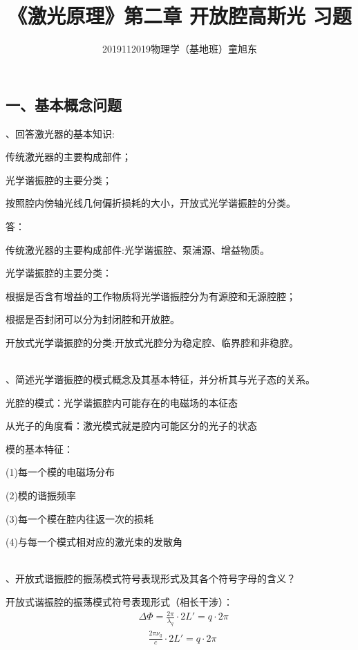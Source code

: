 \documentclass[12pt]{article}
\title{\fangsong《激光原理》\quad 第二章\; 开放腔高斯光 习题}
\author{2019112019物理学（基地班）童旭东}
\begin{document}
\maketitle

\subsection*{一、基本概念问题}

{、回答激光器的基本知识:
\par \quad \quad 传统激光器的主要构成部件；
\par \quad \quad 光学谐振腔的主要分类；
\par \quad \quad 按照腔内傍轴光线几何偏折损耗的大小，开放式光学谐振腔的分类。
}

{\kaishu
\par 答：
\par 
传统激光器的主要构成部件:光学谐振腔、泵浦源、增益物质。
\par 
光学谐振腔的主要分类：
\par \quad \quad \quad \quad 
根据是否含有增益的工作物质将光学谐振腔分为有源腔和无源腔腔；
\par \quad \quad \quad \quad 根据是否封闭可以分为封闭腔和开放腔。
\par 
开放式光学谐振腔的分类:开放式光腔分为稳定腔、临界腔和非稳腔。
}
\\

{、简述光学谐振腔的模式概念及其基本特征，并分析其与光子态的关系。
}

{\kaishu
\par 
光腔的模式：光学谐振腔内可能存在的电磁场的本征态
\par 
从光子的角度看：激光模式就是腔内可能区分的光子的状态
\par 
模的基本特征：
\par \quad\quad\quad\quad
(1)每一个模的电磁场分布
\par \quad\quad\quad\quad
(2)模的谐振频率
\par \quad\quad\quad\quad
(3)每一个模在腔内往返一次的损耗
\par \quad\quad\quad\quad
(4)与每一个模式相对应的激光束的发散角
}
\\

{、开放式谐振腔的振荡模式符号表现形式及其各个符号字母的含义？
}
{\kaishu
\par 
开放式谐振腔的振荡模式符号表现形式（相长干涉）：
\begin{align*}
    &\Delta \Phi
    =\frac{2\pi}{\lambda_q}\cdot 2L'
    =q\cdot 2\pi\\
    &\quad \frac{2\pi \nu_q}{c}\cdot 2L'=q\cdot 2\pi
\end{align*}
}
\\
\end{document}
